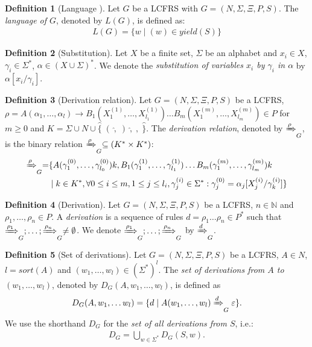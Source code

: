 \documentclass{tudscrartcl}
\theoremstyle{definition}
\newtheorem{definition}{Definition}[section]
\newcommand{\rpath}[2]{\xRightarrow{\text{#1}}_{#2}}
\begin{document}
\begin{definition}[Language \cite{kallmeyer10}]
	Let $G$ be a LCFRS with $G = (N, \Sigma, \Xi, P, S)$.
	The \emph{language of $G$}, denoted by $L(G)$, is defined as:
	\begin{align*}
		L(G) = \{w \mid (w) \in yield(S)\}
	\end{align*}
\end{definition}

\begin{definition}[Substitution]
	Let $X$ be a finite set, $\Sigma$ be an alphabet and
	$x_i \in X$, $\gamma_i \in \Sigma^*$, $\alpha \in (X \cup \Sigma)^*$.
	We denote the \emph{substitution of variables $x_i$ by $\gamma_i$ in $\alpha$}
	by $\alpha[x_i / \gamma_i]$.
\end{definition}

\begin{definition}[Derivation relation]
	Let $G = (N, \Sigma, \Xi, P, S)$ be a LCFRS,\\
	$\rho = A(\alpha_1, \ldots, \alpha_l) \to B_1(X^{(1)}_1, \ldots, X^{(1)}_{l_1})
	\ldots B_m(X^{(m)}_1, \ldots, X^{(m)}_{l_m}) \in P$ for $m \geq 0$
	and $K = \Sigma \cup N \cup \hat{\{} \; (\; \hat{,} \; )\; \hat{,} \; ,\; \hat{\}}$.
	The \emph{derivation relation}, denoted by $\rpath{$\rho$}{G}$, is the binary relation
	$\rpath{$\rho$}{G}  \subseteq (K^* \times K^*)$:
	\begin{align*}
		\rpath{$\rho$}{G} =&
			\{A(\gamma_1^{(0)}, \ldots, \gamma_{l_0}^{(0)})k,
			B_1(\gamma_1^{(1)}, \ldots, \gamma_{l_1}^{(1)}) \ldots
			B_m(\gamma_1^{(m)}, \ldots, \gamma_{l_m}^{(m)})k\\
			&\mid k \in K^*, \forall 0 \leq i \leq m, 1 \leq j \leq l_i,
			\gamma_j^{(i)} \in \Sigma^*:
			\gamma_j^{(0)} = \alpha_j[X_j^{(i)} / \gamma_k^{(i)}]\}
	\end{align*}
\end{definition}

\begin{definition}[Derivation]
	Let $G = (N, \Sigma, \Xi, P, S)$ be a LCFRS, $n \in \mathbb{N}$ and 
	$\rho_1, \ldots, \rho_n \in P$.
	A \emph{derivation} is a sequence of rules $d = \rho_1 \ldots \rho_n \in P^*$
	such that $\rpath{$\rho_1$}{G}; \ldots; \rpath{$\rho_n$}{G} \neq \emptyset$.
	We denote $\rpath{$\rho_1$}{G}; \ldots; \rpath{$\rho_n$}{G}$ by $\rpath{$d$}{G}$.
\end{definition}

\begin{definition}[Set of derivations]
	Let $G = (N, \Sigma, \Xi, P, S)$ be a LCFRS, $A \in N$,
	$l = sort(A)$ and $(w_1, \ldots, w_l) \in (\Sigma^*)^l$.
	The \emph{set of derivations from $A$ to $(w_1, \ldots, w_l)$},
	denoted by $D_G(A, w_1, \ldots, w_l)$, is defined as
	\begin{align*}
		D_G(A, w_1, \ldots w_l) =
			\{ d \mid A(w_1, \ldots, w_l) \rpath{$d$}{G} \varepsilon \}.
	\end{align*}
	We use the shorthand $D_G$ for the \emph{set of all derivations from $S$}, i.e.:
	\begin{align*}
		D_G = \bigcup_{w \in \Sigma^*}D_G(S, w).
	\end{align*}
\end{definition}
\end{document}
